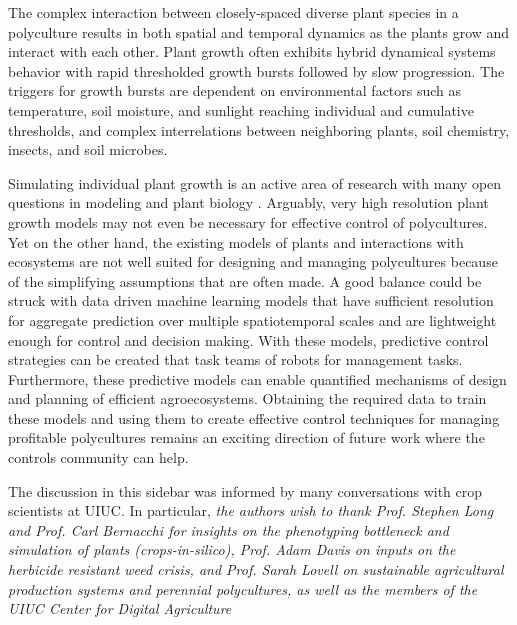 \documentclass[letterpaper,12pt,peerreviewca,draftcls]{IEEEtran}
\begin{document}
The complex interaction between closely-spaced diverse plant species in a polyculture results in both spatial and temporal dynamics as the plants grow and interact with each other. %
Plant growth often exhibits hybrid dynamical systems behavior with rapid thresholded growth bursts followed by slow progression. The triggers for growth bursts are dependent on  environmental factors such as temperature, soil moisture, and sunlight reaching individual and cumulative thresholds, and complex interrelations between neighboring plants, soil chemistry, insects, and soil microbes. 

Simulating individual plant growth is an active area of research with many open questions in modeling and plant biology \cite{zhu2016plants}. Arguably, very high resolution plant growth models may not even be necessary for effective control of polycultures. Yet on the other hand, the  %
 existing models of plants and interactions with ecosystems \cite{Stehfest2007a,Foley1996a, Kucharik2003a,Friedl2010a, Rodrigues2010a, Nunes2013a} are not well suited for designing and managing polycultures because of the simplifying assumptions that are often made. A good balance could be struck with data driven machine learning models that have sufficient resolution for aggregate prediction over multiple spatiotemporal scales and are lightweight enough for control and decision making. With these models, predictive control strategies can be created that task teams of robots for management tasks. Furthermore, these predictive models can enable quantified mechanisms of design and planning of efficient agroecosystems.  
 Obtaining the required data to train these models and using them to create effective control techniques for managing profitable polycultures remains an exciting direction of future work where the controls community can help.
 
 The discussion in this sidebar was informed by many conversations with  crop scientists at UIUC. In particular, 
\textit{the authors wish to thank Prof. Stephen Long and Prof. Carl Bernacchi for insights on the phenotyping bottleneck and simulation of plants (\textit{crops-in-silico}), Prof. Adam Davis on inputs on the herbicide resistant weed crisis, and Prof. Sarah Lovell on sustainable agricultural production systems and perennial polycultures, as well as the members of the UIUC Center for Digital Agriculture} 
\end{document}
